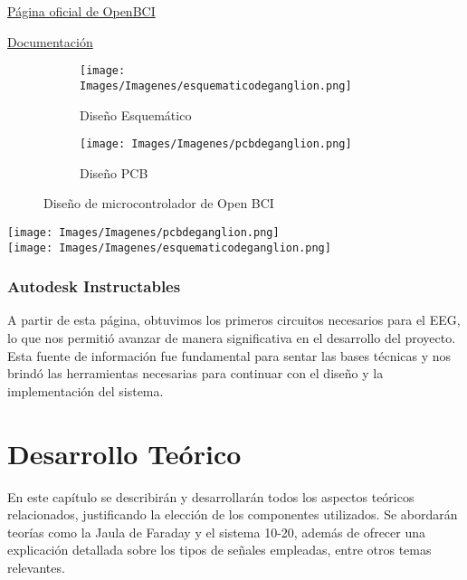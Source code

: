 \documentclass{article}
\begin{document}
\begin{center}
    \href{https://openbci.com/}{Página oficial de OpenBCI}

    
    \href{https://docs.openbci.com/}{Documentación}

    
\end{center}

\begin{figure}[h!]
\centering

\begin{subfigure}[b]{0.45\linewidth}
    \texttt{[image: Images/Imagenes/esquematicodeganglion.png]}
    \caption{Diseño Esquemático}
    \label{fig:westminster_lateral}
\end{subfigure}

\begin{subfigure}[b]{0.45\linewidth}
\texttt{[image: Images/Imagenes/pcbdeganglion.png]}
\caption{Diseño PCB}
\label{fig:westminster_aerea}

\end{subfigure}
\caption{Diseño de microcontrolador de Open BCI}
\label{fig:westminster}
\end{figure}

\begin{center}
    \texttt{[image: Images/Imagenes/pcbdeganglion.png]}\\

    \texttt{[image: Images/Imagenes/esquematicodeganglion.png]}\\
\end {center}

\subsubsection{Autodesk Instructables}
A partir de esta página, obtuvimos los primeros circuitos necesarios para el EEG, lo que nos permitió avanzar de manera significativa en el desarrollo del proyecto. Esta fuente de información fue fundamental para sentar las bases técnicas y nos brindó las herramientas necesarias para continuar con el diseño y la implementación del sistema.

\section{Desarrollo Teórico}
En este capítulo se describirán y desarrollarán todos los aspectos teóricos relacionados, justificando la elección de los componentes utilizados. Se abordarán teorías como la Jaula de Faraday y el sistema 10-20, además de ofrecer una explicación detallada sobre los tipos de señales empleadas, entre otros temas relevantes.
\end{document}
